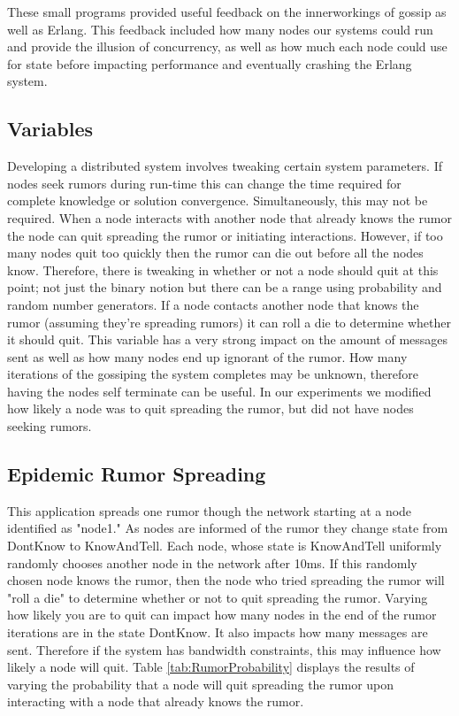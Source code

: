 \documentclass[11pt,twocolumn]{article}
\begin{document}
These small programs provided useful feedback on the innerworkings of gossip as well as Erlang.  This feedback included how many nodes our systems could run and provide the illusion of concurrency, as well as how much each node could use for state before impacting performance and eventually crashing the Erlang system.

\subsection{Variables}

Developing a distributed system involves tweaking certain system parameters.  If nodes seek rumors during run-time this can change the time required for complete knowledge or solution convergence.  Simultaneously, this may not be required.  When a node interacts with another node that already knows the rumor the node can quit spreading the rumor or initiating interactions.  However, if too many nodes quit too quickly then the rumor can die out before all the nodes know.  Therefore, there is tweaking in whether or not a node should quit at this point; not just the binary notion but there can be a range using probability and random number generators.  If a node contacts another node that knows the rumor (assuming they're spreading rumors) it can roll a die to determine whether it should quit.  This variable has a very strong impact on the amount of messages sent as well as how many nodes end up ignorant of the rumor.  How many iterations of the gossiping the system completes may be unknown, therefore having the nodes self terminate can be useful.  In our experiments we modified how likely a node was to quit spreading the rumor, but did not have nodes seeking rumors.

\subsection{Epidemic Rumor Spreading}

This application spreads one rumor though the network starting at a node identified as "node1."  As nodes are informed of the rumor they change state from DontKnow to KnowAndTell.  Each node, whose state is KnowAndTell uniformly randomly chooses another node in the network after 10ms.  If this randomly chosen node knows the rumor, then the node who tried spreading the rumor will "roll a die" to determine whether or not to quit spreading the rumor.  Varying how likely you are to quit can impact how many nodes in the end of the rumor iterations are in the state DontKnow.  It also impacts how many messages are sent.  Therefore if the system has bandwidth constraints, this may influence how likely a node will quit.  Table \ref{tab:RumorProbability} displays the results of varying the probability that a node will quit spreading the rumor upon interacting with a node that already knows the rumor.
\end{document}

